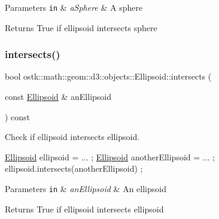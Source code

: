 \begin{DoxyParams}[1]{Parameters}
\mbox{\tt in}  & {\em a\+Sphere} & A sphere \\
\hline
\end{DoxyParams}
\begin{DoxyReturn}{Returns}
True if ellipsoid intersects sphere 
\end{DoxyReturn}
\mbox{\label{classostk_1_1math_1_1geom_1_1d3_1_1objects_1_1_ellipsoid_a2e886a6b074d7feada943ebc60f3d873}} 
\subsubsection{\texorpdfstring{intersects()}{intersects()}\hspace{0.1cm}{\footnotesize\ttfamily [8/10]}}
{\footnotesize\ttfamily bool ostk\+::math\+::geom\+::d3\+::objects\+::\+Ellipsoid\+::intersects (\begin{DoxyParamCaption}\item[{const \hyperlink{classostk_1_1math_1_1geom_1_1d3_1_1objects_1_1_ellipsoid}{Ellipsoid} \&}]{an\+Ellipsoid }\end{DoxyParamCaption}) const}



Check if ellipsoid intersects ellipsoid. 


\begin{DoxyCode}
\hyperlink{classostk_1_1math_1_1geom_1_1d3_1_1objects_1_1_ellipsoid_a106c71abf9503f3d06b2613c1c7e9d65}{Ellipsoid} ellipsoid = ... ;
\hyperlink{classostk_1_1math_1_1geom_1_1d3_1_1objects_1_1_ellipsoid_a106c71abf9503f3d06b2613c1c7e9d65}{Ellipsoid} anotherEllipsoid = ... ;
ellipsoid.intersects(anotherEllipsoid) ;
\end{DoxyCode}



\begin{DoxyParams}[1]{Parameters}
\mbox{\tt in}  & {\em an\+Ellipsoid} & An ellipsoid \\
\hline
\end{DoxyParams}
\begin{DoxyReturn}{Returns}
True if ellipsoid intersects ellipsoid 
\end{DoxyReturn}
\mbox{\label{classostk_1_1math_1_1geom_1_1d3_1_1objects_1_1_ellipsoid_a52ec9908e019762565ea341577b82944}} 
